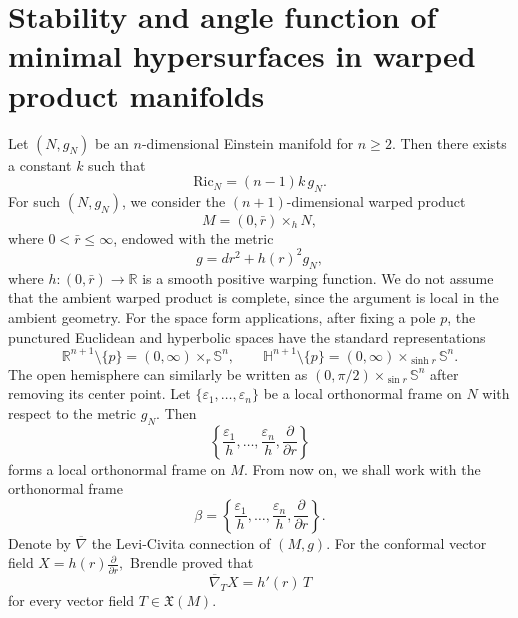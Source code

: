 \documentclass[amssymb,amstex,amsmath,11pt]{article}
\numberwithin{equation}{section}
\renewcommand{\epsilon}{\varepsilon}
\theoremstyle{plain}
\theoremstyle{definition}
\theoremstyle{remark}
\def\Ric{\textrm{Ric}}
\begin{document}
\section{Stability and angle function of minimal hypersurfaces in warped product manifolds} \label{sec5}

Let $(N,g_N)$ be an $n$-dimensional Einstein manifold for $n\ge 2$. Then there exists a constant $k$ such that
\begin{equation}\label{rcm}
\Ric_N=(n-1)k\,g_N.
\end{equation}
For such $(N,g_N)$, we consider the $(n+1)$-dimensional   warped product
$$
M=(0,\bar r)\times_h N,
$$
where $0<\bar r\le\infty$, endowed with the metric
$$
g=dr^2+h(r)^2g_N,
$$
where $h:(0,\bar r)\to\mathbb{R}$ is a smooth positive warping function. We do not assume that the ambient warped product is complete, since the argument is local in the ambient geometry. For the space form applications, after fixing a pole $p$, the punctured Euclidean and hyperbolic spaces have the standard representations
$$
\mathbb{R}^{n+1}\setminus\{p\}=(0,\infty)\times_r\mathbb{S}^n,
\qquad
\mathbb{H}^{n+1}\setminus\{p\}=(0,\infty)\times_{\sinh r}\mathbb{S}^n.
$$
The open hemisphere can similarly be written as $(0,\pi/2)\times_{\sin r}\mathbb{S}^n$ after removing its center point.
Let $\{\epsilon_1,\ldots,\epsilon_n\}$ be a local orthonormal frame on $N$ with respect to the metric $g_N$. Then
$$
\left\{\frac{\epsilon_1}{h},\ldots,\frac{\epsilon_n}{h},\frac{\partial}{\partial r}\right\}
$$
forms a local orthonormal frame on $M$. From now on, we shall work with the orthonormal frame
\begin{equation*}\label{b1}
\beta=\left\{\frac{\epsilon_1}{h},\ldots,\frac{\epsilon_n}{h},\frac{\partial}{\partial r}\right\}.
\end{equation*}
Denote by $\overline{\nabla}$ the Levi-Civita connection of $(M,g)$. For the conformal vector field $X=h(r)\frac{\partial}{\partial r},$
Brendle \cite[Lemma~2.2]{brendle13} proved that
\begin{equation*}
\overline{\nabla}_T X=h'(r)\,T
\end{equation*}
for every vector field $T\in \mathfrak{X}(M)$.
\end{document}
